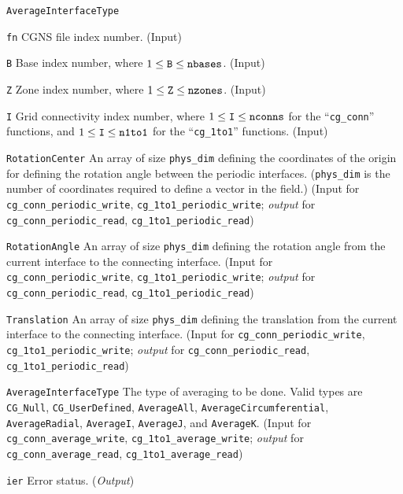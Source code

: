 \begin{Ventryi}{\texttt{AverageInterfaceType}}\raggedright
\item [\texttt{fn}]
      CGNS file index number.
      (\textcolor{input}{Input})
\item [\texttt{B}]
      Base index number, where $1 \leq \text{\texttt{B}} \leq \text{\texttt{nbases}}$.
      (\textcolor{input}{Input})
\item [\texttt{Z}]
      Zone index number, where $1 \leq \text{\texttt{Z}} \leq \text{\texttt{nzones}}$.
      (\textcolor{input}{Input})
\item [\texttt{I}]
      Grid connectivity index number, where
      $1 \leq \text{\texttt{I}} \leq \text{\texttt{nconns}}$
      for the ``\texttt{cg\_conn}'' functions, and
      $1 \leq \text{\texttt{I}} \leq \text{\texttt{n1to1}}$
      for the ``\texttt{cg\_1to1}'' functions.
      (\textcolor{input}{Input})
\item [\texttt{RotationCenter}]
      An array of size \texttt{phys\_dim} defining the coordinates of
      the origin for defining the rotation angle between the periodic
      interfaces.
      (\texttt{phys\_dim} is the number of coordinates required to define
      a vector in the field.)
      (\textcolor{input}{Input} for \texttt{cg\_conn\_periodic\_write},
      \texttt{cg\_1to1\_periodic\_write};
      \textcolor{output}{\textit{output}} for \texttt{cg\_conn\_periodic\_read},
      \texttt{cg\_1to1\_periodic\_read})
\item [\texttt{RotationAngle}]
      An array of size \texttt{phys\_dim} defining the rotation angle from
      the current interface to the connecting interface.
      (\textcolor{input}{Input} for \texttt{cg\_conn\_periodic\_write},
      \texttt{cg\_1to1\_periodic\_write};
      \textcolor{output}{\textit{output}} for \texttt{cg\_conn\_periodic\_read},
      \texttt{cg\_1to1\_periodic\_read})
\item [\texttt{Translation}]
      An array of size \texttt{phys\_dim} defining the translation from
      the current interface to the connecting interface.
      (\textcolor{input}{Input} for \texttt{cg\_conn\_periodic\_write},
      \texttt{cg\_1to1\_periodic\_write};
      \textcolor{output}{\textit{output}} for \texttt{cg\_conn\_periodic\_read},
      \texttt{cg\_1to1\_periodic\_read})
\item [\texttt{AverageInterfaceType}]
      The type of averaging to be done.
      Valid types are \texttt{CG\_Null}, \texttt{CG\_UserDefined}, \texttt{AverageAll},
      \texttt{AverageCircumferential}, \texttt{AverageRadial}, \texttt{AverageI},
      \texttt{AverageJ}, and \texttt{AverageK}.
      (\textcolor{input}{Input} for \texttt{cg\_conn\_average\_write},
      \texttt{cg\_1to1\_average\_write};
      \textcolor{output}{\textit{output}} for \texttt{cg\_conn\_average\_read},
      \texttt{cg\_1to1\_average\_read})
\item [\texttt{ier}]
      Error status.
      (\textcolor{output}{\textit{Output}})
\end{Ventryi}


